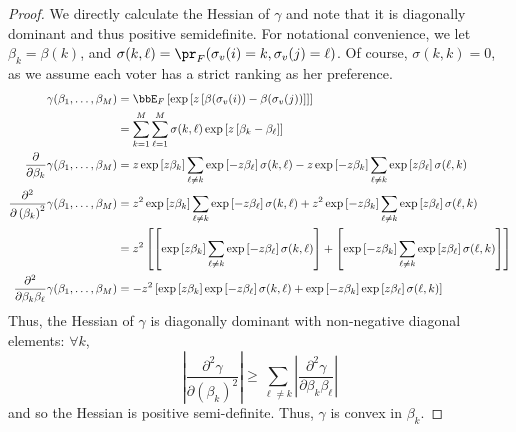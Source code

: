 \documentclass[10pt]{article}
\begin{document}
\begin{ReviewVerbatim}
\begin{proof}
	We directly calculate the Hessian of $\gamma$ and note that it is diagonally dominant and thus positive semidefinite. For notational convenience, we let $\beta_k = \beta(k)$, and $\sigma(k,\ell) = \pr_F(\sigma_v(i) = k, \sigma_v(j) = \ell)$. Of course, $\sigma(k,k)=0$, as we assume each voter has a strict ranking as her preference.
	\begin{align*}
	\gamma(\beta_1,\dots,\beta_M) &=   \bbE_F\left[\exp\left[z\left[\beta(\sigma_v(i)) - \beta(\sigma_v(j))\right]\right]\right]\\
	&= \sum_{k=1}^{M}\sum_{\ell = 1}^M \sigma(k,\ell) \exp\left[z \left[\beta_k - \beta_\ell \right]\right]\\
	\frac{\partial}{\partial \beta_k} \gamma(\beta_1,\dots,\beta_M)	&= z\exp\left[z \beta_k\right]\sum_{\ell\neq k}\exp\left[-z \beta_\ell\right]\sigma(k,\ell) - z\exp\left[-z \beta_k\right]\sum_{\ell\neq k}\exp\left[z \beta_\ell\right]\sigma(\ell,k)\\
	\frac{\partial^2}{\partial \left(\beta_k\right)^2} \gamma(\beta_1,\dots,\beta_M)	&= z^2\exp\left[z \beta_k\right]\sum_{\ell\neq k}\exp\left[-z \beta_\ell\right]\sigma(k,\ell) + z^2\exp\left[-z \beta_k\right]\sum_{\ell\neq k}\exp\left[z \beta_\ell\right]\sigma(\ell,k)\\
	&= z^2 \left[\left[\exp\left[z \beta_k\right]\sum_{\ell\neq k}\exp\left[-z \beta_\ell\right]\sigma(k,\ell)\right] + \left[\exp\left[-z \beta_k\right]\sum_{\ell\neq k}\exp\left[z \beta_\ell\right]\sigma(\ell,k)\right]\right]\\
	\frac{\partial^2}{\partial \beta_k\beta_\ell}\gamma(\beta_1,\dots,\beta_M)&= -z^2\left[\exp\left[z \beta_k\right]\exp\left[-z \beta_\ell\right]\sigma(k,\ell) + \exp\left[-z \beta_k\right]\exp\left[z \beta_\ell\right]\sigma(\ell,k)\right]
	\end{align*}
	Thus, the Hessian of $\gamma$ is diagonally dominant with non-negative diagonal elements: $\forall k$,
	$$ \left|\frac{\partial^2 \gamma}{\partial \left(\beta_k\right)^2}  \right| \geq \sum_{\ell\neq k}\left|\frac{\partial^2 \gamma}{\partial \beta_k\beta_\ell}  \right|$$
	and so the Hessian is positive semi-definite. Thus, $\gamma$ is convex in $\beta_k$.






\end{proof}
\end{ReviewVerbatim}
\end{document}
